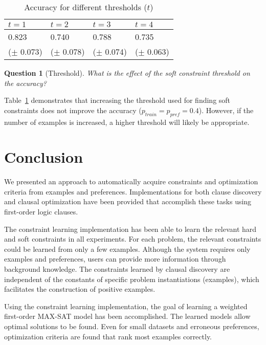 \documentclass[letterpaper]{article}
\newtheorem{question}{Question}
\theoremstyle{definition}
\begin{document}
  \begin{table}[!htp]
    \caption{Accuracy for different thresholds ($t$)}
    \begin{tabularx}{\linewidth}{XXXX}
      $t = 1$ & $t = 2$ & $t = 3$ & $t = 4$ \\
      \toprule
     0.823 & 0.740 & 0.788 & 0.735 \\
     ($\pm$ 0.073) & ($\pm$ 0.078) & ($\pm$ 0.074) & ($\pm$ 0.063)
    \end{tabularx}
    \label{tbl:limiet}
  \end{table}

\begin{question}[Threshold]
  What is the effect of the soft constraint threshold on the accuracy?
\end{question}

Table~\ref{tbl:limiet} demonstrates that increasing the threshold used for finding soft constraints does not improve the accuracy ($p_{train} = p_{pref} = 0.4$).
However, if the number of examples is increased, a higher threshold will likely be appropriate.


\section{Conclusion}
We presented an approach to automatically acquire constraints and optimization criteria from examples and preferences.
Implementations for both clause discovery and clausal optimization have been provided that accomplish these tasks using first-order logic clauses.

The constraint learning implementation has been able to learn the relevant hard and soft constraints in all experiments.
For each problem, the relevant constraints could be learned from only a few examples.
Although the system requires only examples and preferences, users can provide more information through background knowledge.
The constraints learned by clausal discovery are independent of the constants of specific problem instantiations (examples), which facilitates the construction of positive examples.

Using the constraint learning implementation, the goal of learning a weighted first-order MAX-SAT model has been accomplished.
The learned models allow optimal solutions to be found.
Even for small datasets and erroneous preferences, optimization criteria are found that rank most examples correctly.
\end{document}
